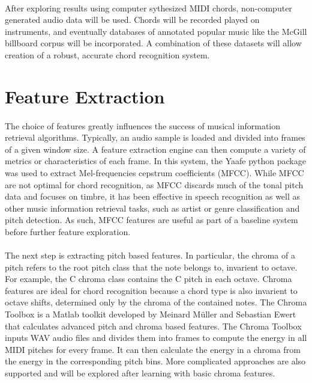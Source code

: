 \documentclass{article}
\begin{document}
\paragraph{}
After exploring results using computer sythesized MIDI chords, non-computer generated audio data will be used. Chords will be recorded played on instruments, and
eventually databases of annotated popular music like the McGill billboard corpus will be incorporated. A combination of these datasets will allow creation of a robust,
accurate chord recognition system.

\section{Feature Extraction}
\paragraph{}
The choice of features greatly influences the success of musical information retrieval algorithms. Typically, an audio sample is loaded and divided into
frames of a given window size. A feature extraction engine can then compute a variety of metrics or characteristics of each frame.  In this system, the Yaafe python
package was used to extract Mel-frequencies cepstrum coefficients (MFCC). While MFCC are not optimal for chord recognition, as MFCC discards much of the tonal pitch data and
focuses on timbre, it has been effective in speech recognition as well as other music information retrieval tasks, such as artist or genre classification and pitch detection.
As such, MFCC features are useful as part of a baseline system before further feature exploration.

\paragraph{}
The next step is extracting pitch based features. In particular, the chroma of a pitch refers to the root pitch class that the note belongs to, invarient to octave.
For example, the C chroma class contains the C pitch in each octave. Chroma features are ideal for chord recognition because a chord type is also invarient to octave shifts, determined
only by the chroma of the contained notes.  The Chroma Toolbox is a Matlab toolkit developed by Meinard M\"uller and Sebastian Ewert that calculates advanced pitch and chroma based features.
The Chroma Toolbox inputs WAV audio files and divides them into frames to compute the energy in all MIDI pitches for every frame. It can then calculate the energy in a chroma from the energy in the corresponding
pitch bins. More complicated approaches are also supported and will be explored after learning with basic chroma features.
\end{document}
